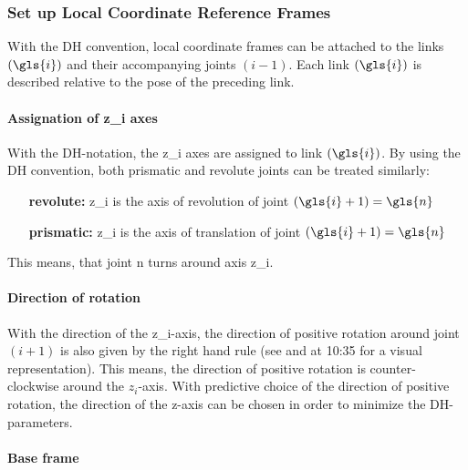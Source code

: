 \subsubsection{Set up Local Coordinate Reference Frames} \label{sec:localRefFrame}
With the \ac{DH} convention, local coordinate frames can be attached to the links $ (\gls{i}) $ and their accompanying joints $ (i-1) $.
Each link $(\gls{i})$ is described relative to the pose of the preceding link.



\paragraph{Assignation of \gls{z_i} axes}\label{par:z_iAxesAssign}

With the \ac{DH}-notation, the \gls{z_i} axes are assigned to link $(\gls{i})$. 
By using the  \ac{DH} convention, both prismatic and revolute joints can be treated similarly: %
\begin{itemize}[wide=\parindent]
	\item[\textbf{revolute:}] \gls{z_i} is the axis of revolution of joint $(\gls{i}+1) = \gls{n}$
	\item[\textbf{prismatic:}] \gls{z_i} is the axis of translation of joint $(\gls{i}+1) = \gls{n}$
\end{itemize}
This means, that joint \gls{n} turns around axis \gls{z_i}.

\paragraph{Direction of rotation}
With the direction of the \gls{z_i}-axis, the direction of positive rotation around joint $(i+1)$ is also given by the right hand rule (see \cite{RightHandRule} and \cite{Angela_U1S2P1} at 10:35 for a visual representation). This means, the direction of positive rotation is counter-clockwise around the $z_i$-axis.
With predictive choice of the direction of positive rotation, the direction of the z-axis can be chosen in order to minimize the DH-parameters. %



\paragraph{Base frame}

